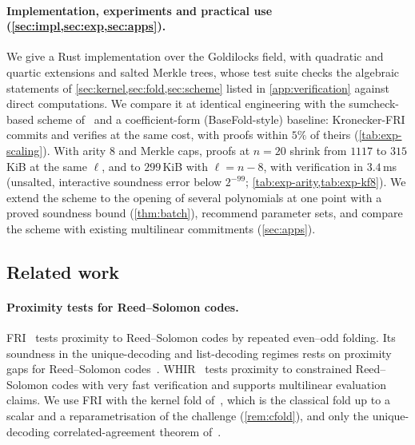 \paragraph{Implementation, experiments and practical use (\cref{sec:impl,sec:exp,sec:apps}).}
We give a Rust implementation over the Goldilocks field, with quadratic and quartic extensions and salted Merkle trees, whose test suite checks the algebraic statements of \cref{sec:kernel,sec:fold,sec:scheme} listed in \cref{app:verification} against direct computations.
We compare it at identical engineering with the sumcheck-based scheme of~\cite{Mkh26} and a coefficient-form (BaseFold-style) baseline: Kronecker-FRI commits and verifies at the same cost, with proofs within $5\%$ of theirs (\cref{tab:exp-scaling}). With arity $8$ and Merkle caps, proofs at $n = 20$ shrink from $1117$ to $315$\,KiB at the same $\ell$, and to $299$\,KiB with $\ell = n - 8$, with verification in $3.4$\,ms (unsalted, interactive soundness error below $2^{-99}$; \cref{tab:exp-arity,tab:exp-kf8}).
We extend the scheme to the opening of several polynomials at one point with a proved soundness bound (\cref{thm:batch}), recommend parameter sets, and compare the scheme with existing multilinear commitments (\cref{sec:apps}).

\subsection{Related work}\label{sec:intro:related}

\paragraph{Proximity tests for Reed--Solomon codes.}
FRI~\cite{BBHR18} tests proximity to Reed--Solomon codes by repeated even--odd folding.
Its soundness in the unique-decoding and list-decoding regimes rests on proximity gaps for Reed--Solomon codes~\cite{BCIKS23}.
WHIR~\cite{ACFY24} tests proximity to constrained Reed--Solomon codes with very fast verification and supports multilinear evaluation claims.
We use FRI with the kernel fold of~\cite{Mkh26}, which is the classical fold up to a scalar and a reparametrisation of the challenge (\cref{rem:cfold}), and only the unique-decoding correlated-agreement theorem of~\cite{BCIKS23}.

